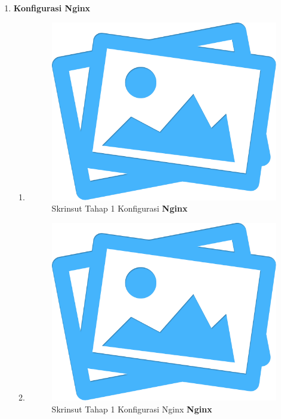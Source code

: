 \begin{enumerate}[label={}]
\begin{enumerate}[label=\roman*]
			\end{enumerate}
		\item 
		\textbf{Konfigurasi \textbf{Nginx}}
		\begin{enumerate}[label=\roman*]	
			\item \mylipsum
			\begin{figure}[H]
				\centering
				\includegraphics[width=0.4\textheight]{images/no-image.png}
				\caption{Skrinsut Tahap 1 Konfigurasi \textbf{Nginx}}
				\label{pdm-final}
			\end{figure}					
			\item \mylipsum
			\begin{figure}[H]
				\centering
				\includegraphics[width=0.4\textheight]{images/no-image.png}
				\caption{Skrinsut Tahap 1 Konfigurasi Nginx \textbf{Nginx}}
				\label{pdm-final}
			\end{figure}	
	 	
	 	
		 \end{enumerate}
	 \end{enumerate}